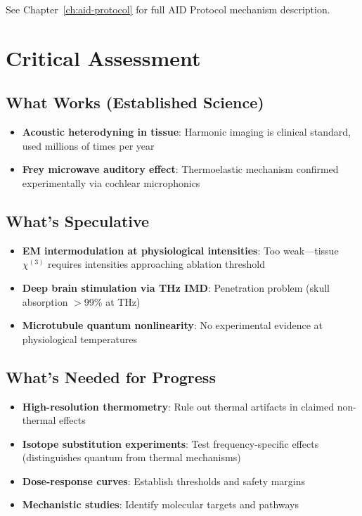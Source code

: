See Chapter~\ref{ch:aid-protocol} for full AID Protocol mechanism description.

\section{Critical Assessment}

\subsection*{What Works (Established Science)}
\begin{itemize}
\item \textbf{Acoustic heterodyning in tissue}: Harmonic imaging is clinical standard, used millions of times per year
\item \textbf{Frey microwave auditory effect}: Thermoelastic mechanism confirmed experimentally via cochlear microphonics
\end{itemize}

\subsection*{What's Speculative}
\begin{itemize}
\item \textbf{EM intermodulation at physiological intensities}: Too weak---tissue $\chi^{(3)}$ requires intensities approaching ablation threshold
\item \textbf{Deep brain stimulation via THz IMD}: Penetration problem (skull absorption $>$99\% at THz)
\item \textbf{Microtubule quantum nonlinearity}: No experimental evidence at physiological temperatures
\end{itemize}

\subsection*{What's Needed for Progress}
\begin{itemize}
\item \textbf{High-resolution thermometry}: Rule out thermal artifacts in claimed non-thermal effects
\item \textbf{Isotope substitution experiments}: Test frequency-specific effects (distinguishes quantum from thermal mechanisms)
\item \textbf{Dose-response curves}: Establish thresholds and safety margins
\item \textbf{Mechanistic studies}: Identify molecular targets and pathways
\end{itemize}

